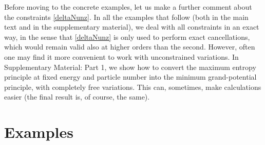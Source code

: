 \documentclass[a4paper, amsfonts, amssymb, amsmath, reprint, showkeys, nofootinbib, twoside, onecolumn,notitlepage]{revtex4-1}
\begin{document}
Before moving to the concrete examples, let us make a further comment about the constraints \eqref{deltaNunz}. In all the examples that follow (both in the main text and in the supplementary material), we deal with all constraints in an exact way, in the sense that \eqref{deltaNunz} is only used to perform exact cancellations, which would remain valid also at higher orders than the second. However, often one may find it more convenient to work with unconstrained variations. In Supplementary Material: Part 1, we show how to convert the maximum entropy principle at fixed energy and particle number into the minimum grand-potential principle, with completely free variations. This can, sometimes, make calculations easier (the final result is, of course, the same).






\section{Examples}
\end{document}
